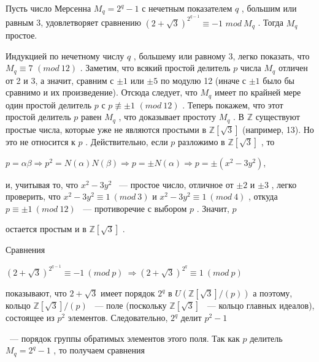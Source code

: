 \documentclass{mai_book}
\begin{document}
\begin{sled}
Пусть число Мерсенна $M_q = 2^q - 1$
 с нечетным показателем $q$
 , 
большим или равным 3, удовлетворяет сравнению $(2+\sqrt 3)^{2^{q-1}}\equiv -1$ $mod \ M_q$
 . Тогда $M_q$
 простое. 
\end{sled}
\begin{myproof}

 Индукцией по нечетному числу $q$
 , большему или равному 3, легко 
показать, что $M_q\equiv 7$ $(mod \ 12)$
. Заметим, что всякий простой  
делитель $p$
 числа $M_q$
 отличен от 2 и 3, а значит, сравним с $\pm 1$
 или $\pm 5$
 по модулю 12 (иначе с $\pm 1$
 было бы сравнимо и их  
произведение). Отсюда следует, что $M_q$
 имеет по крайней мере один простой 
делитель $p$ с $p\not\equiv \pm 1$ $(mod \ 12)$
. Теперь покажем, что этот простой 
делитель $p$
 равен $M_q$
 , что доказывает простоту $M_q$
. 
В $\mathbb{Z}$
 существуют простые числа, которые уже не являются  
простыми в $\mathbb{Z}[\sqrt 3]$
 (например, 13). Но это не относится к $p$
 . Действительно, 
если $p$
 разложимо в $\mathbb{Z}[\sqrt 3]$
 , то 

\begin{center}
$p = \alpha\beta \Rightarrow p^2 = N(\alpha)N(\beta) \Rightarrow p=\pm N(\alpha) \Rightarrow p=\pm(x^2 - 3y^2)$,
\end{center}


и, учитывая то, что $x^2-3y^2$
 ~— простое число, отличное от $\pm 2$ и $\pm 3$
 , 
легко проверить, что $x^2 - 3y^2 \equiv 1 \ (mod \ 3)$ и $x^2 -3y^2\equiv 1 \ (mod \ 4)$
, 
откуда $p\equiv\pm 1 \ (mod \ 12)$
 ~— противоречие с выбором $p$
 . Значит, $p$

остается простым и в $\mathbb{Z}[\sqrt 3]$
. 

Сравнения 

\begin{center}
$(2+\sqrt 3)^{2^{q-1}}\equiv -1 \ (mod \ p) \ \Rightarrow (2+\sqrt 3)^{2^q}\equiv 1 \ (mod \ p)$
\end{center}

показывают, что $2+\sqrt 3$
 имеет порядок $2^q$ в $U(\mathbb{Z}[\sqrt 3]/(p))$
 а  
поэтому, кольцо $\mathbb{Z}[\sqrt 3]/(p)$
 ~— поле (поскольку $\mathbb{Z}[\sqrt 3]$
 ~— кольцо главных 
идеалов), состоящее из $p^2$
 элементов. Следовательно, $2^q$
 делит $p^2-1$
 
~— порядок группы обратимых элементов этого поля. Так как $p$
 делитель $M_q = 2^q -1$
 , то получаем сравнения 
\end{myproof}
\end{document}
